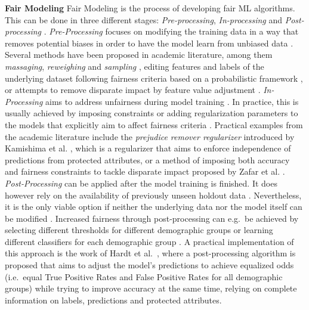 \textbf{Fair Modeling} \newline
Fair Modeling is the process of developing fair ML algorithms. This can be done in three different stages: \textit{Pre-processing}, \textit{In-processing} and \textit{Post-processing} \parencite{Pessach2020}. \newline
\textit{Pre-Processing} focuses on modifying the training data in a way that removes potential biases in order to have the model learn from unbiased data \parencite{Bellamy2019}.
Several methods have been proposed in academic literature, among them \textit{massaging}, \textit{reweighing} and \textit{sampling} \parencite{Kamiran2012}, editing features and labels of the underlying dataset following fairness criteria based on a probabilistic framework \parencite{Calmon2017}, or attempts to remove disparate impact by feature value adjustment \parencite{Feldman2015}. \newline
\textit{In-Processing} aims to address unfairness during model training \parencite{Alessandro2017}. In practice, this is usually achieved by imposing constraints or adding regularization parameters to the models that explicitly aim to affect fairness criteria \parencite{Pessach2020}.
Practical examples from the academic literature include the \textit{prejudice remover regularizer} introduced by Kamishima et al. \parencite{Kamishima2012}, which is a regularizer that aims to enforce independence of predictions from protected attributes, or a method of imposing both accuracy and fairness constraints to tackle disparate impact proposed by Zafar et al. \parencite{Zafar2017}. \newline
\textit{Post-Processing} can be applied after the model training is finished. It does however rely on the availability of previously unseen holdout data \parencite{Alessandro2017}. Nevertheless, it is the only viable option if neither the underlying data nor the model itself can be modified \parencite{Bellamy2019}.
Increased fairness through post-processing can e.g.\ be achieved by selecting different thresholds for different demographic groups or learning different classifiers for each demographic group \parencite{Pessach2020}.
A practical implementation of this approach is the work of Hardt et al.\ \parencite{Hardt2016}, where a post-processing algorithm is proposed that aims to adjust the model's predictions to achieve equalized odds (i.e.\ equal True Positive Rates and False Positive Rates for all demographic groups) while trying to improve accuracy at the same time, relying on complete information on labels, predictions and protected attributes. 

